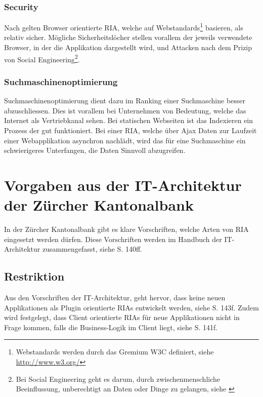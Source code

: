  \subsubsection{Security}
  
  Nach \cite{RichInternetApplication} gelten Browser orientierte \ac{RIA},
  welche auf Webstandards\footnote{Webstandards werden durch das Gremium W3C
  definiert, siehe \url{http://www.w3.org/}} basieren, als relativ sicher.
  Mögliche Sicherheitslöcher stellen vorallem der jeweils verwendete Browser,
  in der die Applikation dargestellt wird, und Attacken nach dem Prizip von
  Social Engineering\footnote{Bei Social Engineering geht es darum, durch
  zwischenmenschliche Beeinflussung, unberechtigt an Daten oder Dinge zu
  gelangen, siehe \cite{SocialEngineering}}.
  
  \subsubsection{Suchmaschinenoptimierung}
  
  Suchmaschinenoptimierung dient dazu im Ranking einer Suchmaschine besser
  abzuschliessen. Dies ist vorallem bei Unternehmen von Bedeutung, welche das
  Internet als Vertriebkanal sehen. Bei statischen Webseiten ist das Indexieren
  ein Prozess der gut funktioniert. Bei einer \ac{RIA}, welche über \ac{Ajax}
  Daten zur Laufzeit einer Webapplikation asynchron nachlädt, wird das für eine
  Suchmaschine ein schwierigeres Unterfangen, die Daten Sinnvoll abzugreifen.
  
  \section{Vorgaben aus der IT-Architektur der Zürcher Kantonalbank}
  
  In der Zürcher Kantonalbank gibt es klare Vorschriften, welche Arten von
  \ac{RIA} eingesetzt werden dürfen. Diese Vorschriften werden im Handbuch der
  IT-Architektur zusammengefasst, siehe \cite{ZkbHandbuchDerItArchitektur} S.
  140ff. 
  
  \subsection{Restriktion}
  
  Aus den Vorschriften der IT-Architektur, geht hervor, dass keine neuen
  Applikationen als Plugin orientierte \acp{RIA} entwickelt werden, siehe
  \cite{ZkbHandbuchDerItArchitektur} S. 143f. Zudem wird festgelegt, dass
  Client orientierte \acp{RIA} für neue Applikationen nicht in Frage kommen,
  falls die Business-Logik im Client liegt, siehe
  \cite{ZkbHandbuchDerItArchitektur} S. 141f.
  
